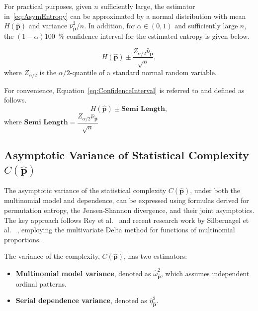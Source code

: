 \documentclass[12pt,a4paper]{article}
\begin{document}
For practical purposes, given $n$ sufficiently large, the estimator in~\eqref{eq:AsymEntropy} can be approximated by a normal distribution with mean $H(\widehat{\mathbf{p}})$ and variance $\widehat{\nu}^2_{\widehat{\mathbf{p}}}/n$. In addition, for $\alpha \in (0,1)$ and sufficiently large $n$, the $(1-\alpha)$\SI{100}{\percent} confidence interval for the estimated entropy is given below.

\begin{equation}
	H(\widehat{\mathbf{p}})\pm \dfrac{Z_{\alpha/2}\widehat{\nu}_{\widehat{\mathbf{p}}}}{\sqrt{n}},
	\label{eq:ConfidenceInterval}
\end{equation} 
where $Z_{\alpha/2}$ is the $\alpha/2$-quantile of a standard normal random variable.

For convenience, Equation~\ref{eq:ConfidenceInterval} is referred to and defined as follows.
\begin{equation}
	H(\widehat{\mathbf{p}})\pm \textbf{Semi Length},
	\label{eq:CI}
\end{equation} 
where $\textbf{Semi Length}=\dfrac{Z_{\alpha/2}\widehat{\nu}_{\widehat{\mathbf{p}}}}{\sqrt{n}}$

\subsection{Asymptotic Variance of Statistical Complexity $C(\widehat{\mathbf{p}})$} \label{Subsec:AsympVarComplexity} 
The asymptotic variance of the statistical complexity $C(\widehat{\mathbf{p}})$, under both the multinomial model and dependence, can be expressed using formulas derived for permutation entropy, the Jensen-Shannon divergence, and their joint asymptotics. The key approach follows Rey et al.~\cite{Rey2025} and recent research work by Silbernagel et al.~\cite{silbernagel2025joint} , employing the multivariate Delta method for functions of multinomial proportions.


The variance of the complexity, $C(\widehat{\mathbf{p}})$, has two estimators:
\begin{itemize}
	\item \textbf{Multinomial model variance}, denoted as $\widehat{\omega}^2_{\widehat{\mathbf{p}}}$, which assumes independent ordinal patterns.
	\item \textbf{Serial dependence variance}, denoted as $\widehat{\eta}^2_{\widehat{\mathbf{p}}}$.
\end{itemize}
\end{document}
